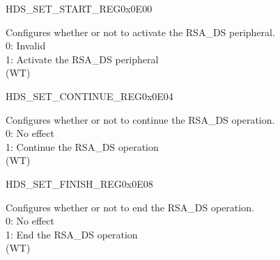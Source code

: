 \begin{register}{H}{DS\_SET\_START\_REG}{0x0E00}\label{regdesc:DSSETSTARTREG}
%
%
\regnewline%
\begin{regdesc}\begin{reglist}
\label{fielddesc:DSSETSTART}\item [DS\_SET\_START] Configures whether or not to activate the RSA\_DS peripheral.\\
0: Invalid\\
1: Activate the RSA\_DS peripheral\\
 (WT)
\end{reglist}\end{regdesc}
\end{register}


\begin{register}{H}{DS\_SET\_CONTINUE\_REG}{0x0E04}\label{regdesc:DSSETCONTINUEREG}
%
%
\regnewline%
\begin{regdesc}\begin{reglist}
\label{fielddesc:DSSETCONTINUE}\item [DS\_SET\_CONTINUE] Configures whether or not to continue the RSA\_DS operation. \\
0: No effect\\
1: Continue the RSA\_DS operation\\
(WT)
\end{reglist}\end{regdesc}
\end{register}


\begin{register}{H}{DS\_SET\_FINISH\_REG}{0x0E08}\label{regdesc:DSSETFINISHREG}
%
%
\regnewline%
\begin{regdesc}\begin{reglist}
\label{fielddesc:DSSETFINISH}\item [DS\_SET\_FINISH] Configures whether or not to end the RSA\_DS operation. \\
0: No effect\\
1: End the RSA\_DS operation\\
(WT)
\end{reglist}\end{regdesc}
\end{register}


